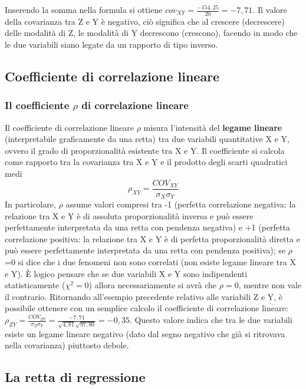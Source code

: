 \begin{esempio}
\vspace{6pt}
Inserendo la somma nella formula si ottiene 
\(cov_{XY}=\frac{-154,25}{20}=-7,71\).
Il valore della covarianza tra Z e Y è negativo, ciò significa che al 
crescere (decrescere) delle modalità di Z, le modalità di Y decrescono 
(crescono), facendo in modo che le due variabili siano legate da un 
rapporto di tipo inverso.
\end{esempio}

\subsection{Coefficiente di correlazione lineare}
\label{subsec:stat02_coeff_correlazione}

\subsubsection{Il coefficiente \(\rho\) di correlazione lineare}

Il coefficiente di correlazione lineare \(\rho\) misura l'intensità del 
\textbf{legame lineare} (interpretabile graficamente da una retta) tra due 
variabili quantitative X e Y, ovvero il grado di proporzionalità esistente 
tra X e Y.
Il coefficiente si calcola come rapporto tra la covarianza tra X e Y e il 
prodotto degli scarti quadratici medi 
\[\rho_{XY}=\frac{COV_{XY}}{\sigma_X\sigma_Y}\]
 In particolare, \(\rho\) assume valori compresi tra -1 (perfetta 
correlazione negativa: la relazione tra X e Y è di assoluta proporzionalità 
inversa e può essere perfettamente interpretata da una retta con pendenza 
negativa) e +1 (perfetta correlazione positiva: la relazione tra X e Y è di 
perfetta proporzionalità diretta e può essere perfettamente interpretata da 
una retta con pendenza positiva); se \(\rho\)=0 si dice che i due fenomeni non 
sono correlati (non esiste legame lineare tra X e Y). 
È logico pensare che se 
due variabili X e Y sono indipendenti statisticamente (\(\chi^2=0\)) allora 
necessariamente si avrà che \(\rho=0\), mentre non vale il contrario.
 Ritornando all'esempio precedente relativo alle variabili Z e Y, è 
possibile ottenere con un semplice calcolo il coefficiente di correlazione 
lineare: 
\(\rho_{ZY}=\frac{COV_{ZY}}{\sigma_Z\sigma_Y}=\frac{-7,71}{\sqrt{4,81}\sqrt{
97,80}}=-0,35\).
 Questo valore indica che tra le due variabili esiste un legame lineare 
negativo (dato dal segno negativo che già si ritrovava nella covarianza) 
piuttosto debole.
 
\subsection{La retta di regressione}
\label{subsec:stat02_regressione}

